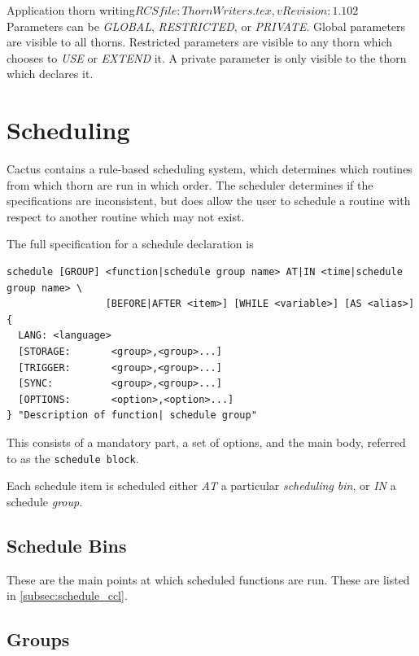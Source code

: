 \begin{cactuspart}{2}{Application thorn writing}{$RCSfile: ThornWriters.tex,v $}{$Revision: 1.102 $}
Parameters can be {\em GLOBAL}, {\em RESTRICTED}, or {\em PRIVATE}.
Global parameters are visible to all thorns.  Restricted parameters
are visible to any thorn which chooses to {\em USE} or {\em EXTEND}
it.  A private parameter is only visible to the thorn which declares
it.



\chapter{Scheduling}
\label{chap:scheduling}

Cactus contains a rule-based scheduling system, which determines which
routines from which thorn are run in which order.  The scheduler
determines if the specifications are inconsistent, but does allow the
user to schedule a routine with respect to another routine which may not
exist.

The full specification for a schedule declaration is
\begin{verbatim}
schedule [GROUP] <function|schedule group name> AT|IN <time|schedule group name> \
                 [BEFORE|AFTER <item>] [WHILE <variable>] [AS <alias>]
{
  LANG: <language>
  [STORAGE:       <group>,<group>...]
  [TRIGGER:       <group>,<group>...]
  [SYNC:          <group>,<group>...]
  [OPTIONS:       <option>,<option>...]
} "Description of function| schedule group"
\end{verbatim}

This consists of a mandatory part, a set of options, and the main
body, referred to as the {\tt schedule block}.

Each schedule item is scheduled either {\em AT} a particular {\em
scheduling bin}, or {\em IN} a schedule {\em group}.

\section{Schedule Bins}
\label{scheduling:schedule_bins}

These are the main points at which scheduled functions are run.
These are listed in \ref{subsec:schedule_ccl}.

\section{Groups}
\label{scheduling:groups}


\end{cactuspart}
